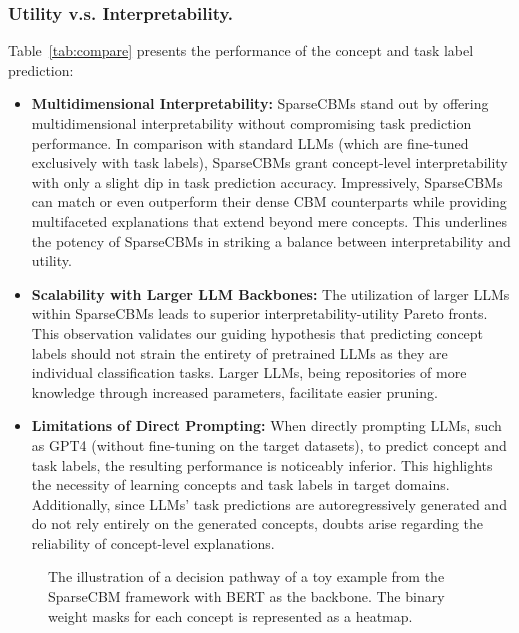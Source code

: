 \documentclass[letterpaper]{article} %
\begin{document}
\subsubsection{Utility v.s. Interpretability.}
Table~\ref{tab:compare} presents the performance of the concept and task label prediction:
\begin{itemize}
    \item \textbf{Multidimensional Interpretability:} SparseCBMs stand out by offering multidimensional interpretability without compromising task prediction performance. In comparison with standard LLMs (which are fine-tuned exclusively with task labels), SparseCBMs grant concept-level interpretability with only a slight dip in task prediction accuracy. Impressively, SparseCBMs can match or even outperform their dense CBM counterparts while providing multifaceted explanations that extend beyond mere concepts. This underlines the potency of SparseCBMs in striking a balance between interpretability and utility.
    \item \textbf{Scalability with Larger LLM Backbones:} The utilization of larger LLMs within SparseCBMs leads to superior interpretability-utility Pareto fronts. This observation validates our guiding hypothesis that predicting concept labels should not strain the entirety of pretrained LLMs as they are individual classification tasks. Larger LLMs, being repositories of more knowledge through increased parameters, facilitate easier pruning.
    \item \textbf{Limitations of Direct Prompting:} When directly prompting LLMs, such as GPT4 (without fine-tuning on the target datasets), to predict concept and task labels, the resulting performance is noticeably inferior. This highlights the necessity of learning concepts and task labels in target domains. Additionally, since LLMs' task predictions are autoregressively generated and do not rely entirely on the generated concepts, doubts arise regarding the reliability of concept-level explanations.
\end{itemize}



\begin{figure}[b]
  \centering
  \caption{{The illustration of a decision pathway of a toy example from the SparseCBM framework with BERT as the backbone. The binary weight masks for each concept is represented as a heatmap.}}\label{fig:example}
\end{figure}
\end{document}
